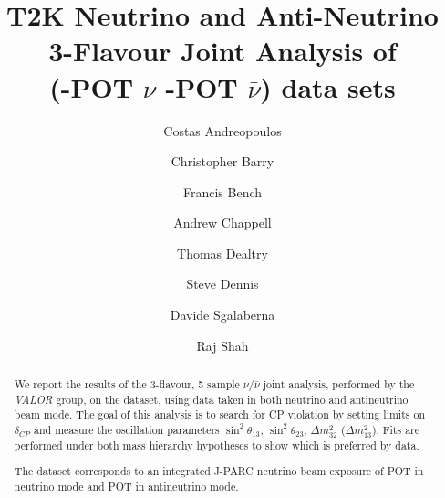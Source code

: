 %
%

\begin{frontmatter}
\title{
  T2K Neutrino and Anti-Neutrino 3-Flavour Joint Analysis of  \\
  \RunPeriod (\TotalPotNuRunOneNine-POT $\nu$  \TotalPotNuBarRunOneNine-POT $\bar{\nu}$)
  data sets
}
\author[RAL,LIV]  {Costas Andreopoulos}
\author[LIV]  {Christopher Barry}
\author[LIV]  {Francis Bench}
\author[WAR]  {Andrew Chappell}
\author[LANCS]  {Thomas Dealtry}
\author[RAL,LIV]  {Steve Dennis}
\author[GEN]     {Davide Sgalaberna}
\author[RAL,OXF]  {Raj Shah}

\address[RAL]   {Science \& Technology Facilities Council (STFC), Rutherford Appleton Laboratory,\\ Harwell Oxford Campus, OX11 0QX, UK}
\address[LIV]   {University of Liverpool, Physics Department,\\ Liverpool, L69 7ZE, UK} 
\address[OXF]   {University of Oxford, Subdepartment of Particle Physics,\\ Oxford, OX1 3RH, UK}
\address[WAR]   {University of Warwick, Physics Department,\\ Coventry, CV4 7AL, UK}
\address[LANCS] {Lancaster University, Physics Department,\\ Lancaster, LA1 4YB, UK}
\address[GEN]  {University of Geneva, Departement de physique nucleaire et corpusculaire,\\ 1211 Geneve, Switzerland}

%
%

\begin{abstract}

We report the results of the 3-flavour, 5 sample $\nu/\bar{\nu}$ joint analysis, performed by the {\em VALOR} group, on the \RunPeriod dataset, using data taken in both neutrino and antineutrino beam mode. The goal of this analysis is to search for CP violation by setting limits on $\delta_{CP}$ and measure the oscillation parameters $\sin^2 \theta_{13}$, $\sin^2 \theta_{23}$, $\Delta m^2_{32}$ ($\Delta m^2_{13}$). Fits are performed under both mass hierarchy hypotheses to show which is preferred by data.

The \RunPeriod dataset corresponds to an integrated J-PARC neutrino beam exposure of \TotalPotNu{} POT in neutrino mode and \TotalPotNuBar{} POT in antineutrino mode.


\end{abstract}
\end{frontmatter}
